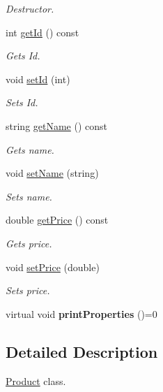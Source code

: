 \begin{DoxyCompactItemize}
\begin{DoxyCompactList}\small\item\em Destructor. \end{DoxyCompactList}\item 
int \hyperlink{classProduct_ad3a7bc1643966d05dc73caadc714f116}{get\+Id} () const 
\begin{DoxyCompactList}\small\item\em Gets Id. \end{DoxyCompactList}\item 
void \hyperlink{classProduct_afeb389b5d13ac1e68bbdafe41c898689}{set\+Id} (int)
\begin{DoxyCompactList}\small\item\em Sets Id. \end{DoxyCompactList}\item 
string \hyperlink{classProduct_afe337fda9b87862958b1f0934fb7f8cd}{get\+Name} () const 
\begin{DoxyCompactList}\small\item\em Gets name. \end{DoxyCompactList}\item 
void \hyperlink{classProduct_ae5aa54c86d99f87b2b6bca4aa1a0479f}{set\+Name} (string)
\begin{DoxyCompactList}\small\item\em Sets name. \end{DoxyCompactList}\item 
double \hyperlink{classProduct_a5cb527ac8c2763bb2aa92cd157c69477}{get\+Price} () const 
\begin{DoxyCompactList}\small\item\em Gets price. \end{DoxyCompactList}\item 
void \hyperlink{classProduct_aacd8e249939d497c95881ae859280d48}{set\+Price} (double)
\begin{DoxyCompactList}\small\item\em Sets price. \end{DoxyCompactList}\item 
virtual void {\bfseries print\+Properties} ()=0\hypertarget{classProduct_a2258435eb75f901b13f44f83da4927d8}{}\label{classProduct_a2258435eb75f901b13f44f83da4927d8}

\end{DoxyCompactItemize}


\subsection{Detailed Description}
\hyperlink{classProduct}{Product} class. 

